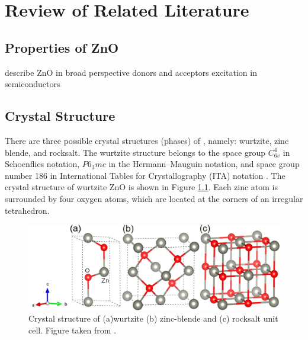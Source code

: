 \chapter{Review of Related Literature} \label{chap:rrl}
\section{Properties of ZnO}
	describe ZnO in broad perspective
	donors and acceptors
	excitation in semiconductors
\section{Crystal Structure}
There are three possible crystal structures (phases) of , namely: wurtzite, zinc blende, and rocksalt. The wurtzite structure belongs to the space group $C^4_{6v}$ in Schoenflies notation, $P6_3mc$ in the  Hermann–Mauguin notation, and space group number 186 in International Tables for Crystallography (ITA) notation \citep{Hahn2005}. The crystal structure of wurtzite ZnO is shown in Figure \ref{fig:ZnO_unit}. Each zinc atom is surrounded by four oxygen atoms, which are located
at the corners of an irregular tetrahedron.

\begin{figure}[tbh!] 
	\centering
	\includegraphics[width=0.7\linewidth]{"images/rrl/ZnO_unit"}
	\caption[Crystal structure of (a) wurtzite (b) zinc-blende and (c) rocksalt  unit cell]{Crystal structure of (a)wurtzite (b) zinc-blende and (c) rocksalt  unit cell. Figure taken from \citep{Ma2013}.}
	\label{fig:ZnO_unit}
\end{figure}

